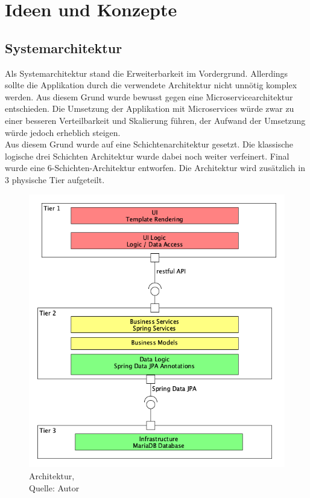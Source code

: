 \section{Ideen und Konzepte}
\subsection{Systemarchitektur}
Als Systemarchitektur stand die Erweiterbarkeit im Vordergrund. Allerdings sollte die Applikation durch die verwendete Architektur nicht unnötig komplex werden. Aus diesem Grund wurde bewusst gegen eine Microservicearchitektur entschieden. Die Umsetzung der Applikation mit Microservices würde zwar zu einer besseren Verteilbarkeit und Skalierung führen, der Aufwand der Umsetzung würde jedoch erheblich steigen. \\
Aus diesem Grund wurde auf eine Schichtenarchitektur gesetzt. Die klassische logische drei Schichten Architektur wurde dabei noch weiter verfeinert. Final wurde eine 6-Schichten-Architektur entworfen. Die Architektur wird zusätzlich in 3 physische Tier aufgeteilt. 

\begin{figure}[H]
	\centering
	\includegraphics[scale=0.3]{images/architecture.png}
	\caption[Architektur]{Architektur,\\ Quelle: Autor}
	\label{img: Architektur}
\end{figure}

